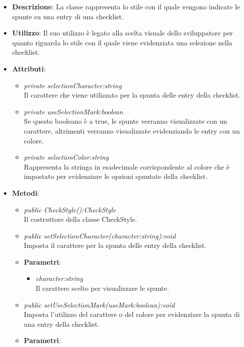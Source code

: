 \begin{itemize}
\item \textbf{Descrizione}: La classe rappresenta lo stile con il quale vengono indicate le spunte su una entry di una checklist.
\item \textbf{Utilizzo}: Il suo utilizzo è legato alla scelta visuale dello sviluppatore per quanto riguarda lo stile con il quale viene evidenziata una selezione nella checklist.
\item \textbf{Attributi}:
	\begin{itemize}
	\item \textit{private selectionCharacter:string}\\
	Il carattere che viene utilizzato per la spunta delle entry della checklist.
	\item \textit{private useSelectionMark:boolean}\\
	Se questo booleano è a true, le spunte verranno visualizzate con un carattere, altrimenti verranno visualizzate evidenziando le entry con un colore.
	\item \textit{private selectionColor:string}\\
	Rappresenta la stringa in esadecimale corrispondente al colore che è impostato per evidenziare le opzioni spuntate della checklist.
	\end{itemize}
\item \textbf{Metodi}:
	\begin{itemize}
	\item \textit{public CheckStyle():CheckStyle}\\
	Il costruttore della classe CheckStyle.
	\item \textit{public setSelectionCharacter(character:string):void}\\
	Imposta il carattere per la spunta delle entry della checklist.
		\item{\textbf{Parametri}: \begin{itemize}
		\item \textit{character:string}\\
		Il carattere scelto per visualizzare le spunte.
		\end{itemize}}
	\item \textit{public setUseSelectionMark(useMark:boolean):void}\\
	Imposta l'utilizzo del carattere o del colore per evidenziare la spunta di una entry della checklist.
		\item{\textbf{Parametri}: \begin{itemize}

\end{itemize}}
\end{itemize}
\end{itemize}

